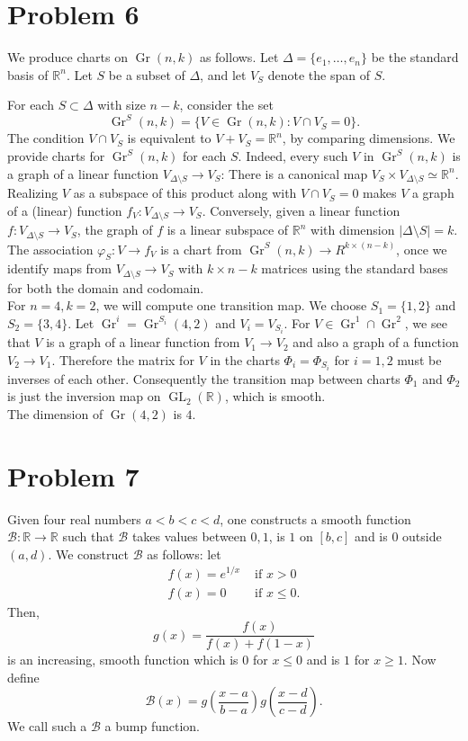 \documentclass{amsart}
\numberwithin{equation}{section}
\theoremstyle{plain}
\theoremstyle{definition}
\theoremstyle{remark}
\newcommand{\B}{\mathcal{B}}
\renewcommand{\_}[2]{\underbrace{#1}_{#2}}
\renewcommand{\^}[2]{\overbrace{#1}_{#2}}
\newcommand{\R}{\mathbb{R}}
\newcommand{\GL}{\operatorname{GL}}
\newcommand{\Gr}{\operatorname{Gr}}
\begin{document}
\section*{Problem 6}
We produce charts on $\Gr(n,k)$ as follows. Let $\Delta = \{ e_1, \dots, e_n\}$ be the standard basis of $\R^n$. Let $S$ be a subset of $\Delta$, and let $V_S$ denote the span of $S$.

For each $S \subset \Delta$ with size $n-k$, consider the set \[\Gr^S(n,k) = \{ V \in \Gr(n,k) : V \cap V_S = 0\}.\]
The condition $V\cap V_S$ is equivalent to $V + V_S = \R^n$, by comparing dimensions. We provide charts for $\Gr^S(n,k)$ for each $S$. Indeed, every such $V$ in $\Gr^S(n,k)$ is a graph of a linear function $V_{\Delta \setminus S} \to V_S$: There is a canonical map $V_S \times V_{\Delta \setminus S} \simeq \R^n$. Realizing $V$ as a subspace of this product along with $V \cap V_S = 0$ makes $V$ a graph of a (linear) function $f_V: V_{\Delta \setminus S} \to V_S$. Conversely, given a linear function $f: V_{\Delta \setminus S} \to V_S$, the graph of $f$ is a linear subspace of $\R^n$ with dimension $|\Delta \setminus S| = k$. The association $\varphi_S: V \to f_V$ is a chart from $\Gr^S(n,k) \to R^{k \times (n-k)}$, once we identify maps from $V_{\Delta \setminus S} \to V_S$ with $k\times n-k$ matrices using the standard bases for both the domain and codomain. \\

For $n=4, k=2$, we will compute one transition map. We choose $S_1 =\{1,2\}$ and $S_2 = \{3,4\}$. Let $\Gr^i = \Gr^{S_i}(4,2)$ and $V_i = V_{S_i}$. For $V \in \Gr^1 \cap \Gr^2$, we see that $V$ is a graph of a linear function from $V_1 \to V_2$ and also a graph of a function $V_2 \to V_1$. Therefore the matrix for $V$ in the charts $\Phi_i = \Phi_{S_i}$ for $i=1,2$ must be inverses of each other. Consequently the transition map between charts $\Phi_1$ and $\Phi_2$ is just the inversion map on $\GL_2(\R)$, which is smooth.\\

The dimension of $\Gr(4,2)$ is $4$. 
\section*{Problem 7}
Given four real numbers $a<b<c<d$, one constructs a smooth function $\B:\R\to \R$ such that $\B$ takes values between $0, 1$, is $1$ on $[b,c]$ and is $0$ outside $(a,d)$. We construct $\B$ as follows: let \begin{align*} f(x) = e^{1/x} & \text{ if } x>0\\ f(x) = 0 & \text{ if } x\leq 0. \end{align*} Then, $$g(x) = \frac{f(x)}{f(x) + f(1-x)}$$ is an increasing, smooth function which is $0$ for $x \leq 0$ and is $1$ for $x\geq 1$. Now define $$\B(x) = g\left(\frac{x-a}{b-a}\right)g\left(\frac{x-d}{c-d}\right).$$ We call such a $\B$ a bump function.
\end{document}
